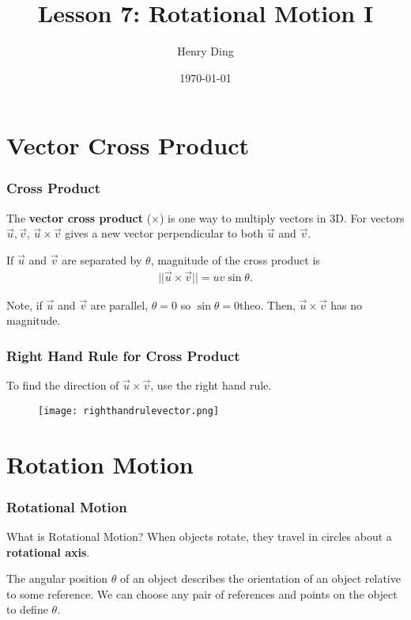 \documentclass[20pt]{beamer}
\author{Henry Ding}
\date{\today}
\title{Lesson 7: Rotational Motion I}
\begin{document}
\frame{\titlepage}

\section{Vector Cross Product}

\begin{frame}
	\frametitle{Cross Product}
	\begin{definition}
		The \textbf{vector cross product} ($\times$) is one way to multiply vectors in 3D. For vectors $\vec{u}, \vec{v}$, $\vec{u} \times \vec{v}$ gives a new vector perpendicular to both $\vec{u}$ and $\vec{v}$.
	\end{definition}
	\begin{figure}[ht]
		\centering
		\label{fig:crossproduct}
	\end{figure}
	\begin{theorem}
		If $\vec{u}$ and $\vec{v}$ are separated by $\theta$, magnitude of the cross product is
		\begin{align*}
		||\vec{u} \times \vec{v}|| = u v \sin \theta.
		\end{align*}
	\end{theorem}
	Note, if $\vec{u}$ and $\vec{v}$ are parallel, $\theta = 0$ so $\sin \theta = 0$theo.  Then, $\vec{u} \times \vec{v}$ has no magnitude.
\end{frame}

\begin{frame}
	\frametitle{Right Hand Rule for Cross Product}
	\begin{theorem}
		To find the direction of $\vec{u} \times \vec{v}$, use the right hand rule.
	\end{theorem}
	\begin{figure}[ht]
		\centering
		\texttt{[image: righthandrulevector.png]}
		\label{fig:righthandrulevector}
	\end{figure}
\end{frame}

\section{Rotation Motion}

\begin{frame}
	\frametitle{Rotational Motion}
	\begin{block}{What is Rotational Motion?}
		When objects rotate, they travel in circles about a \textbf{rotational axis}.
	\end{block}
	\begin{figure}[ht]
		\centering
		\label{fig:angularpos}
	\end{figure}
	\begin{definition}
		The angular position $\theta$ of an object describes the orientation of an object relative to some reference.
		We can choose any pair of references and points on the object to define $\theta$.
	\end{definition}
\end{frame}
\end{document}
